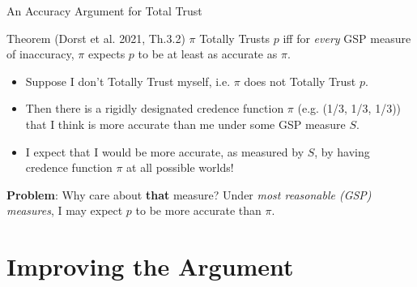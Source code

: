 \documentclass[aspectratio=169, dvipsnames]{beamer}
\newcommand{\E}{\mathbb{E}}
\begin{document}

\begin{frame}{An Accuracy Argument for Total Trust}
  \begin{block}{Theorem (Dorst et al. 2021, Th.3.2)}
    $\pi$ Totally Trusts $p$ iff for \textit{every} GSP measure of inaccuracy,
    $\pi$ expects $p$ to be at least as accurate as $\pi$. 
  \end{block}
  \begin{itemize}
  \item Suppose I don't Totally Trust myself, i.e. $\pi$ does not Totally Trust $p$.
  \item Then there is a rigidly designated credence function $\pi$ (e.g. (1/3, 1/3, 1/3)) that I think is more accurate
    than me under some GSP measure $S$.
  \item I expect that I would be more accurate, as measured by $S$, by having credence function $\pi$ at all possible worlds!
  \end{itemize}

  \textbf{Problem}: Why care about \alert{\textbf{that}} measure? Under \textit{most reasonable (GSP) measures}, I may
  expect $p$ to be more accurate than $\pi$.
\end{frame}


\section{Improving the Argument}

\end{document}
